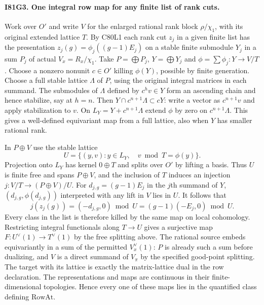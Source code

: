 \paragraph{I81G3. One integral row map for any finite list of rank cuts.}
Work over $O'$ and write $V$ for the enlarged rational rank block
$\rho/\chi_1$, with its original extended lattice $T$. By C80L1
each rank cut $z_j$ in a given finite list has the presentation
$z_j(g)=\phi_j((g-1)E_j)$ on a stable finite submodule $Y_j$
in a sum $P_j$ of actual $V_x=R_x/\chi_1$. Take
$P=\bigoplus P_j$, $Y=\bigoplus Y_j$ and
$\phi=\sum\phi_j:Y\to V/T$. Choose a nonzero nonunit $c\in O'$
killing $\phi(Y)$, possible by finite generation. Choose a full
stable lattice $\Lambda$ of $P$, using the original integral
matrices in each summand. The submodules of $\Lambda$ defined by
$c^h v\in Y$ form an ascending chain and hence stabilize, say at
$h=n$. Then
$Y\cap c^{n+1}\Lambda\subset cY$: write a vector as $c^{n+1}v$
and apply stabilization to $v$. On $L_Y=Y+c^{n+1}\Lambda$
extend $\phi$ by zero on $c^{n+1}\Lambda$. This gives a
well-defined equivariant map from a full lattice, also when
$Y$ has smaller rational rank.

In $P\oplus V$ use the stable lattice
\[
 U=\{(y,v): y\in L_Y,\quad v\bmod T=\phi(y)\}.
\]
Projection onto $L_Y$ has kernel $0\oplus T$ and splits over $O'$
by lifting a basis. Thus $U$ is finite free and spans $P\oplus V$,
and the inclusion of $T$ induces an injection
$j:V/T\longrightarrow (P\oplus V)/U$.
For $d_{j,g}=(g-1)E_j$ in the $j$th summand of $Y$,
$(d_{j,g},\phi(d_{j,g}))$ interpreted with any lift in $V$
lies in $U$. It follows that
\[
 j(z_j(g))=(-d_{j,g},0)\bmod U
           =(g-1)(-E_j,0)\bmod U .
\]
Every class in the list is therefore killed by the same map on
local cohomology. Restricting integral functionals along $T\to U$
gives a surjective map $F:U^\vee(1)\to T^\vee(1)$
by the free splitting above. The rational source embeds
equivariantly in a sum of the permitted $V_x^\vee(1)$:
$P$ is already such a sum before dualizing, and $V$ is a direct
summand of $V_\pi$ by the specified good-point splitting.
The target with its lattice is exactly the matrix-lattice dual
in the row declaration. The representations and maps are continuous
in their finite-dimensional topologies. Hence every one of these
maps lies in the quantified class defining $\mathrm{RowAt}$.

